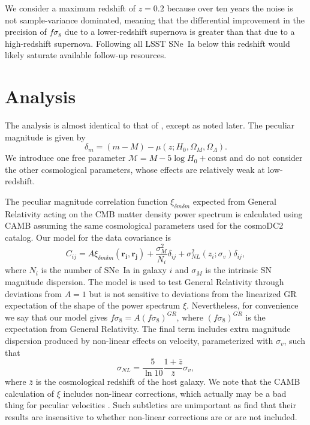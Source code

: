 \documentclass{aastex62}   	%
\begin{document}
We consider a maximum redshift of $z=0.2$ because over ten years the noise is not sample-variance dominated, meaning that the differential improvement
in the precision of
$f\sigma_8$ due to a lower-redshift supernova is greater than that due to a high-redshift supernova.  Following all LSST SNe~Ia below this redshift 
would likely saturate available follow-up resources.


\section{Analysis}
The analysis is  almost identical to that of \citet{2015JCAP...12..033H, 2017JCAP...05..015H}, except as noted later.  
The peculiar magnitude is given by 
\begin{equation}
\delta_m=(m - M) - \mu(z;H_0, \Omega_M, \Omega_\Lambda).
\label{data:eqn}
\end{equation}  We introduce one free parameter 
$\mathcal{M} = M - 5\log{H_0} + \text{const}$ and do not consider the other cosmological parameters, whose effects are relatively weak at low-redshift.


The peculiar magnitude correlation
function $\xi_{\delta m \delta m}$ \citep{2011ApJ...741...67D,2015JCAP...12..033H} expected from General Relativity acting on the CMB
matter density power spectrum is calculated using CAMB \citep{Lewis:2002ah}  assuming the same
cosmological parameters used for the cosmoDC2 catalog.  Our model for the data covariance
is
\begin{equation}
C_{ij} = A\xi_{\delta m \delta m}(\mathbf{r_i},\mathbf{r_j}) + \frac{\sigma_M^2}{N_i} \delta_{ij} + \sigma^2_{NL}(z_i;\sigma_{v})\delta_{ij},
\label{cov:eqn}
\end{equation}
where $N_i$ is the number of SNe~Ia in galaxy $i$ and $\sigma_M$ is the intrinsic SN magnitude dispersion.
The model is used to test General Relativity through deviations from $A=1$ but is not sensitive to deviations
from the linearized GR expectation of the shape of the power spectrum 
$\xi$.
Nevertheless, for
convenience we say that our model gives $f\sigma_8 = A (f\sigma_8)^{GR}$, where $(f\sigma_8)^{GR}$ is the expectation
from General Relativity. 
The final term includes extra magnitude dispersion produced by non-linear effects on velocity, parameterized with $\sigma_{v}$, such that
\begin{equation}
\sigma_{NL} = \frac{5}{\ln{10}} \frac{1+\bar{z}}{\bar{z}} \sigma_v,
\end{equation}
where $\bar{z}$ is the cosmological redshift of the host galaxy.
We note that the CAMB calculation of $\xi$ includes non-linear corrections, which actually may be a bad thing for peculiar velocities \citep{2015MNRAS.454.3920H}. 
Such subtleties are unimportant as \citet{2015JCAP...12..033H} find that their results are insensitive to whether non-linear corrections are or are not included.
\end{document}
